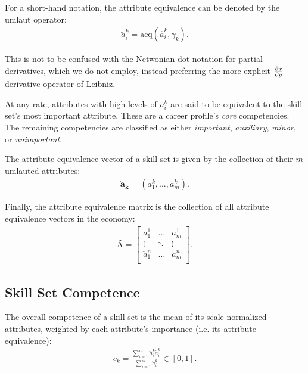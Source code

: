 \documentclass{elsarticle} %
\begin{document}
For a short-hand notation, the attribute equivalence can be denoted by the
umlaut operator:
\begin{gather}
    \ddot{a}_{i}^{k} = \text{aeq}(\hat{a}_{i}^{k}, \gamma_{k})
    .
\end{gather}

This is not to be confused with the Netwonian dot notation for partial
derivatives, which we do not employ, instead preferring the more explicit
$\partialderivative{x}{y}$ derivative operator of Leibniz.

At any rate, attributes with high levels of $\ddot{a}_{i}^{k}$ are said to be
equivalent to the skill set's most important attribute. These are a career
profile's \textit{core} competencies. The remaining competencies are classified
as either \textit{important}, \textit{auxiliary}, \textit{minor}, or
\textit{unimportant}.

The attribute equivalence vector of a skill set is given by the collection of
their $m$ umlauted attributes:
\begin{gather}
    \boldsymbol{\ddot{a}_{k}} = (\ddot{a}_{1}^{k}, ..., \ddot{a}_{m}^{k})
    .
\end{gather}

Finally, the attribute equivalence matrix is the collection of all attribute
equivalence vectors in the economy:
\begin{gather}
    \textbf{Ä} =
    \begin{bmatrix}
        \ddot{a}_{1}^{1} & \hdots & \ddot{a}_{m}^{1} \\
        \vdots           & \ddots & \vdots           \\
        \ddot{a}_{1}^{n} & \hdots & \ddot{a}_{m}^{n} \\
    \end{bmatrix}
    .
\end{gather}

\subsection{Skill Set Competence}
The overall competence of a skill set is the mean of its scale-normalized
attributes, weighted by each attribute's importance (i.e. its attribute
equivalence):
\begin{gather}
    c_k =
    \frac{
    \sum_{i=1}^{m}{
    \ddot{a}_{i}^{k}
    \tilde{a}_{i}^{k}
    }
    }{
    \sum_{i=1}^{m}{
    \ddot{a}_{i}^{k}
    }
    }
    \in [0,1]
    .
\end{gather}
\end{document}
